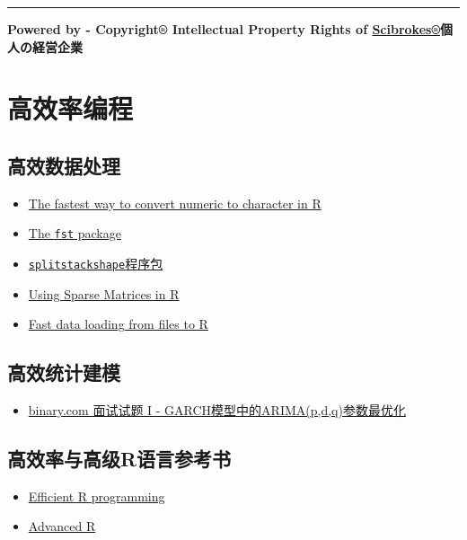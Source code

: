 \documentclass[]{book}
\providecommand{\tightlist}{%
  \setlength{\itemsep}{0pt}\setlength{\parskip}{0pt}}
\theoremstyle{definition}
\theoremstyle{definition}
\theoremstyle{definition}
\theoremstyle{remark}
\begin{document}
\begin{center}\rule{0.5\linewidth}{\linethickness}\end{center}

\textbf{Powered by - Copyright® Intellectual Property Rights of
\href{http://www.scibrokes.com}{Scibrokes®}個人の経営企業}

\hypertarget{hft}{%
\chapter{高效率编程}\label{hft}}

\section{高效数据处理}

\begin{itemize}
\tightlist
\item
  \href{https://stackoverflow.com/questions/28447014/the-fastest-way-to-convert-numeric-to-character-in-r}{The
  fastest way to convert numeric to character in R}
\item
  \href{http://www.fstpackage.org/}{The \texttt{fst} package}
\item
  \href{https://d.cosx.org/d/420148-splitstackshape}{\texttt{splitstackshape}程序包}
\item
  \href{http://www.johnmyleswhite.com/notebook/2011/10/31/using-sparse-matrices-in-r/}{Using
  Sparse Matrices in R}
\item
  \href{https://appsilon.com/fast-data-loading-from-files-to-r/}{Fast
  data loading from files to R}
\end{itemize}

\section{高效统计建模}

\begin{itemize}
\tightlist
\item
  \href{http://rpubs.com/englianhu/binary-Q1FiGJRGARCH}{binary.com
  面试试题 I - GARCH模型中的ARIMA(p,d,q)参数最优化}
\end{itemize}

\hypertarget{r}{%
\section{高效率与高级R语言参考书}\label{r}}

\begin{itemize}
\tightlist
\item
  \href{https://csgillespie.github.io/efficientR/}{Efficient R
  programming}
\item
  \href{http://adv-r.had.co.nz}{Advanced R}
\end{itemize}
\end{document}
